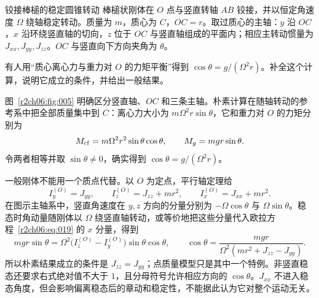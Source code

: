 \begin{practicebox}{铰接棒槌的稳定圆锥转动}
棒槌状刚体在 $O$ 点与竖直转轴 $AB$ 铰接，并以恒定角速度 $\Omega$ 绕轴稳定转动。质量为 $m$，质心为 $C$，$OC=r$。取过质心的主轴：$y$ 沿 $OC$，$x$ 沿环绕竖直轴的切向，$z$ 位于 $OC$ 与竖直轴组成的平面内；相应主转动惯量为 $J_{xx},J_{yy},J_{zz}$。$OC$ 与竖直向下方向夹角为 $\theta$。

有人用“质心离心力与重力对 $O$ 的力矩平衡”得到
$\cos\theta=g/(\Omega^2r)$。补全这个计算，说明它成立的条件，并给出一般结果。
\label{r2ch06:pr:003}
\begin{solution}
图~\ref{r2ch06:fig:005} 明确区分竖直轴、$OC$ 和三条主轴。朴素计算在随轴转动的参考系中把全部质量集中到 $C$：离心力大小为 $m\Omega^2r\sin\theta$，它和重力对 $O$ 的力矩分别为
\begin{equation}
 M_{\rm cf}=m\Omega^2r^2\sin\theta\cos\theta,\qquad
 M_g=mgr\sin\theta.
 \label{r2ch06:eq:027}
\end{equation}
令两者相等并取 $\sin\theta\ne0$，确实得到 $\cos\theta=g/(\Omega^2r)$。

一般刚体不能用一个质点代替。以 $O$ 为定点，平行轴定理给
\[
 I_y^{(O)}=J_{yy},\qquad
 I_z^{(O)}=J_{zz}+mr^2,\qquad
 I_x^{(O)}=J_{xx}+mr^2.
\]
在图示主轴系中，竖直角速度在 $y,z$ 方向的分量分别为
$-\Omega\cos\theta$ 与 $\Omega\sin\theta$。稳态时角动量随刚体以 $\Omega$ 绕竖直轴转动，或等价地把这些分量代入欧拉方程~\eqref{r2ch06:eq:019} 的 $x$ 分量，得到
\begin{equation}
 mgr\sin\theta
 =\Omega^2\bigl(I_z^{(O)}-I_y^{(O)}\bigr)
 \sin\theta\cos\theta,\qquad
 \boxed{\cos\theta=\frac{mgr}
 {\Omega^2(mr^2+J_{zz}-J_{yy})}}.
 \label{r2ch06:eq:028}
\end{equation}
所以朴素结果成立的条件是 $J_{zz}=J_{yy}$；点质量模型只是其中一个特例。非竖直稳态还要求右式绝对值不大于 $1$，且分母符号允许相应方向的 $\cos\theta$。$J_{xx}$ 不进入稳态角度，但会影响偏离稳态后的章动和稳定性，不能据此认为它对整个运动无关。
\figSteadyTop
\end{solution}
\end{practicebox}

